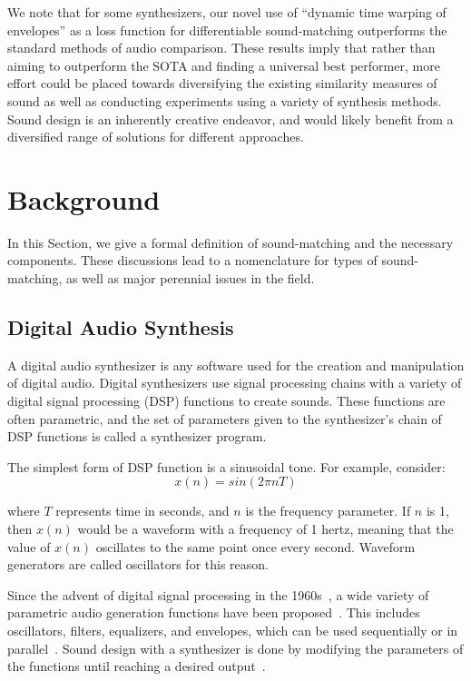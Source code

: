 \documentclass[lettersize,journal]{IEEEtran}
\providecommand{\gls}[1]{#1}
\begin{document}
We note that for some synthesizers, our novel use of ``dynamic time warping of envelopes'' as a loss function for differentiable sound-matching outperforms the standard methods of audio comparison. These results imply that rather than aiming to outperform the SOTA and finding a universal best performer, more effort could be placed towards diversifying the existing similarity measures of sound as well as conducting experiments using a variety of synthesis methods. Sound design is an inherently creative endeavor, and would likely benefit from a diversified range of solutions for different approaches. 

\section{Background}
\label{sec:background}
In this Section, we give a formal definition of sound-matching and the necessary components. These discussions lead to a nomenclature for types of sound-matching, as well as major perennial issues in the field. 

\subsection{Digital Audio Synthesis}
\label{sec:diffSynth}
A digital audio synthesizer is any software used for the creation and manipulation of digital audio. Digital synthesizers use signal processing chains with a variety of digital signal processing (\gls{DSP}) functions to create sounds. These functions are often parametric, and the set of parameters given to the synthesizer's chain of DSP functions is called a synthesizer program.

The simplest form of DSP function is a sinusoidal tone. For example, consider:
\[ x(n) = sin( 2\pi n T)\]

where $T$ represents time in seconds, and $n$ is the frequency parameter. If $n$ is 1, then $x(n)$ would be a waveform with a frequency of 1 hertz, meaning that the value of $x(n)$ oscillates to the same point once every second. Waveform generators are called oscillators for this reason. 


Since the advent of digital signal processing in the 1960s~\cite{stranneby2004digital}, a wide variety of parametric audio generation functions have been proposed~\cite{lyons1997understanding,russ1999sound,shier2020spiegelib}. This includes oscillators, filters, equalizers, and envelopes, which can be used sequentially or in parallel~\cite{lyons1997understanding,russ1999sound}. Sound design with a synthesizer is done by modifying the parameters of the functions until reaching a desired output~\cite{roads1996computer,pinch2004analog}.
\end{document}
